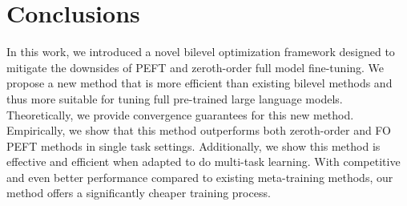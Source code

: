 \section{Conclusions}
In this work, we introduced a novel bilevel optimization framework designed to mitigate the downsides of PEFT and zeroth-order full model fine-tuning. We propose a new method that is more efficient than existing bilevel methods and thus more suitable for tuning full pre-trained large language models. Theoretically, we provide convergence guarantees for this new method. Empirically, we show that this method outperforms both zeroth-order and FO PEFT methods in single task settings. Additionally, we show this method is effective and efficient when adapted to do multi-task learning. With competitive and even better performance compared to existing meta-training methods, our method offers a significantly cheaper training process.